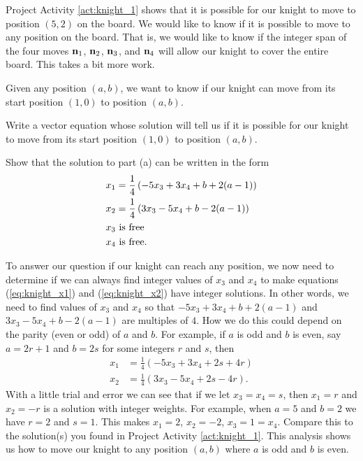 Project Activity \ref{act:knight_1} shows that it is possible for our knight to move to position $(5,2)$ on the board. We would like to know if it is possible to move to any position on the board. That is, we would like to know if the integer span of the four moves $\mathbf{n}_1$, $\mathbf{n}_2$, $\mathbf{n}_3$, and $\mathbf{n}_4$ will allow our knight to cover the entire board. This takes a bit more work. 

\begin{pactivity} \label{act:knight_2} Given any position $(a,b)$, we want to know if our knight can move from its start position $(1,0)$ to position $(a,b)$. 
	\ba
	\item Write a vector equation whose solution will tell us if it is possible for our knight to move from its start position $(1,0)$ to position $(a,b)$. 

	\item Show that the solution to part (a) can be written in the form
	\begin{align}
	x_1 &= \frac{1}{4}\left(-5x_3+3x_4+b+2(a-1)\right) \label{eq:knight_x1} \\
	x_2 &= \frac{1}{4}\left(3x_3-5x_4+b-2(a-1)\right) \label{eq:knight_x2} \\
	x_3 &\text{ is free} \notag \\
	x_4 &\text{ is free.} \notag
	\end{align}

	\ea
\end{pactivity}

To answer our question if our knight can reach any position, we now need to determine if we can always find integer values of $x_3$ and $x_4$ to make equations (\ref{eq:knight_x1}) and (\ref{eq:knight_x2}) have integer solutions. In other words, we need to find values of $x_3$ and $x_4$ so that $-5x_3+3x_4+b+2(a-1)$ and $3x_3-5x_4+b-2(a-1)$ are multiples of $4$. How we do this could depend on the parity (even or odd) of $a$ and $b$. For example, if $a$ is odd and $b$ is even, say $a = 2r+1$ and $b = 2s$ for some integers $r$ and $s$, then
\begin{align*}
x_1 &= \frac{1}{4}\left( -5x_3 + 3x_4 + 2s + 4r\right) \\
x_2 &= \frac{1}{4}\left( 3x_3 - 5x_4 + 2s - 4r \right).
\end{align*}
With a little trial and error we can see that if we let $x_3 = x_4 = s$, then $x_1 = r$ and $x_2 = -r$ is a solution with integer weights. For example, when $a=5$ and $b=2$ we have $r=2$ and $s = 1$. This makes $x_1 = 2$, $x_2 = -2$, $x_3 = 1 = x_4$. Compare this to the solution(s) you found in Project Activity \ref{act:knight_1}. This analysis shows us how to move our knight to any position $(a,b)$ where $a$ is odd and $b$ is even.

